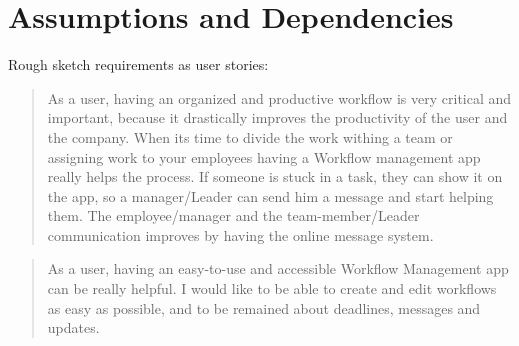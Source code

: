 \documentclass{article}
\begin{document}
\section{Assumptions and Dependencies}
\vspace{10}
Rough sketch requirements as user stories:
\begin{quotation}
    As a user, having an organized and productive workflow is very critical and important, because it drastically improves the productivity of the user and the company. When its time to divide the work withing a team or assigning work to your employees having a Workflow management app really helps the process. If someone is stuck in a task, they can show it on the app, so a manager/Leader can send him a message and start helping them. The employee/manager and the team-member/Leader communication improves by having the online message system.
\end{quotation}
\begin{quotation}
    As a user, having an easy-to-use and accessible Workflow Management app can be really helpful. I would like to be able to create and edit workflows as easy as possible, and to be remained about deadlines, messages and updates.
\end{quotation}
\end{document}
